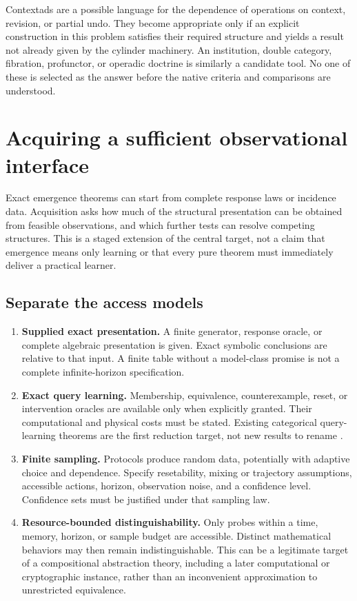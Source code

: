 \documentclass[11pt]{article}
\theoremstyle{remark}
\begin{document}
Contextads are a possible language for the dependence of operations on context, revision, or partial undo. They become appropriate only if an explicit construction in this problem satisfies their required structure and yields a result not already given by the cylinder machinery. An institution, double category, fibration, profunctor, or operadic doctrine is similarly a candidate tool. No one of these is selected as the answer before the native criteria and comparisons are understood.

\section{Acquiring a sufficient observational interface}
\label{sec:acquisition}

Exact emergence theorems can start from complete response laws or incidence data. Acquisition asks how much of the structural presentation can be obtained from feasible observations, and which further tests can resolve competing structures. This is a staged extension of the central target, not a claim that emergence means only learning or that every pure theorem must immediately deliver a practical learner.

\subsection{Separate the access models}

\begin{enumerate}
\item \textbf{Supplied exact presentation.} A finite generator, response oracle, or complete algebraic presentation is given. Exact symbolic conclusions are relative to that input. A finite table without a model-class promise is not a complete infinite-horizon specification.
\item \textbf{Exact query learning.} Membership, equivalence, counterexample, reset, or intervention oracles are available only when explicitly granted. Their computational and physical costs must be stated. Existing categorical query-learning theorems are the first reduction target, not new results to rename \cite{CALF,FunctorialLearning}.
\item \textbf{Finite sampling.} Protocols produce random data, potentially with adaptive choice and dependence. Specify resetability, mixing or trajectory assumptions, accessible actions, horizon, observation noise, and a confidence level. Confidence sets must be justified under that sampling law.
\item \textbf{Resource-bounded distinguishability.} Only probes within a time, memory, horizon, or sample budget are accessible. Distinct mathematical behaviors may then remain indistinguishable. This can be a legitimate target of a compositional abstraction theory, including a later computational or cryptographic instance, rather than an inconvenient approximation to unrestricted equivalence.
\end{enumerate}
\end{document}
